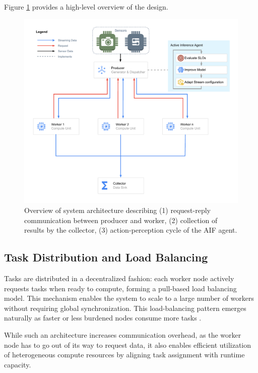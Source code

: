 Figure \ref{fig:parallel-distributed-pipeline} provides a high-level overview of the design.

\begin{figure}[htbp]
    \centering
    \includegraphics[width=\textwidth]{img/methodology/methodology_parallel_pipeline_overview.drawio.pdf}
    \caption{Overview of system architecture describing (1) request-reply communication between producer and worker, (2) collection of results by the collector, (3) action-perception cycle of the AIF agent.}
    \label{fig:parallel-distributed-pipeline}
\end{figure}


\subsection{Task Distribution and Load Balancing}
Tasks are distributed in a decentralized fashion: each worker node actively requests tasks when ready to compute, forming a pull-based load balancing model. This mechanism enables the system to scale to a large number of workers without requiring global synchronization. This load-balancing pattern emerges naturally as faster or less burdened nodes consume more tasks \cite{estrada_comparing_2015}.

While such an architecture increases communication overhead, as the worker node has to go out of its way to request data, it also enables efficient utilization of heterogeneous compute resources by aligning task assignment with runtime capacity.

